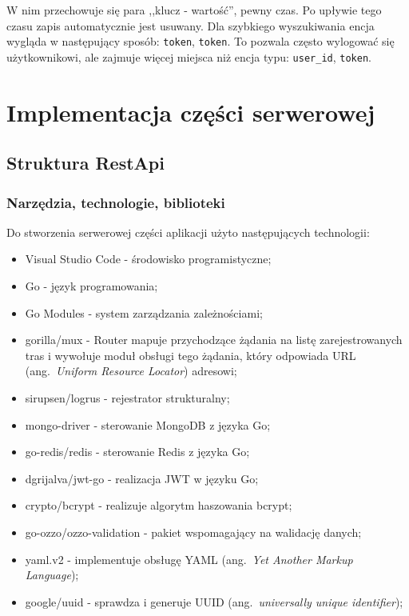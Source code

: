 W nim przechowuje się para ,,klucz - wartość'', pewny czas. Po upływie tego czasu zapis automatycznie jest usuwany.
Dla szybkiego wyszukiwania encja wygląda w następujący sposób: \texttt{token}, \texttt{token}. To pozwala często wylogować się użytkownikowi, ale zajmuje więcej miejsca niż encja typu: \texttt{user\_id}, \texttt{token}.

\section{Implementacja części serwerowej}
% 
\subsection{Struktura RestApi}
% 
\subsubsection{Narzędzia, technologie, biblioteki}
Do stworzenia serwerowej części aplikacji użyto następujących technologii:
\begin{itemize}
\item Visual Studio Code - środowisko programistyczne;
\item Go - język programowania;
\item Go Modules - system zarządzania zależnościami;
\item gorilla/mux - Router mapuje przychodzące żądania na listę zarejestrowanych tras i wywołuje moduł obsługi tego żądania, który odpowiada URL (ang.~\textit{Uniform Resource Locator}) adresowi;
\item sirupsen/logrus - rejestrator strukturalny;
\item mongo-driver - sterowanie MongoDB z języka Go;
\item go-redis/redis - sterowanie Redis z języka Go;
\item dgrijalva/jwt-go - realizacja JWT w języku Go;
\item crypto/bcrypt - realizuje algorytm haszowania bcrypt;
\item go-ozzo/ozzo-validation - pakiet wspomagający na walidację danych;
\item yaml.v2 - implementuje obsługę YAML (ang.~\textit{Yet Another Markup Language});
\item google/uuid - sprawdza i generuje UUID (ang.~\textit{universally unique identifier});
\end{itemize}

% 
